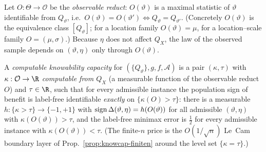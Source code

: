 \begin{definition}\label{def:dich-obs}
Let $O:\Theta\to\mathcal O$ be the \emph{observable reduct}: $O(\vartheta)$ is a
maximal statistic of $\vartheta$ identifiable from $Q_\vartheta$, i.e.\
$O(\vartheta)=O(\vartheta')\iff Q_\vartheta=Q_{\vartheta'}$. (Concretely $O(\vartheta)$
is the equivalence class $[Q_\vartheta]$; for a location family $O(\vartheta)=\mu$,
for a location--scale family $O=(\mu,\sigma)$.) Because $\eta$ does not affect $Q_X$,
the law of the observed sample depends on $(\vartheta,\eta)$ only through $O(\vartheta)$.
\end{definition}

\begin{definition}\label{def:dich-cap}
A \emph{computable knowability capacity} for $(\{Q_\vartheta\},g,f,\mathcal A)$ is a
pair $(\kappa,\tau)$ with $\kappa:\mathcal O\to\R$ \emph{computable from $Q_X$}
(a measurable function of the observable reduct $O$) and $\tau\in\R$, such that for
every admissible instance the population sign of benefit is label-free identifiable
\emph{exactly} on $\{\kappa(O)>\tau\}$: there is a measurable
$h:\{\kappa>\tau\}\to\{-1,+1\}$ with $\operatorname{sign}\Delta(\vartheta,\eta)=h(O(\vartheta))$
for all admissible $(\vartheta,\eta)$ with $\kappa(O(\vartheta))>\tau$, and the
label-free minimax error is $\tfrac12$ for every admissible instance with
$\kappa(O(\vartheta))<\tau$. (The finite-$n$ price is the $O(1/\sqrt n)$ Le~Cam
boundary layer of Prop.~\ref{prop:knowcap-finiten} around the level set $\{\kappa=\tau\}$.)
\end{definition}

